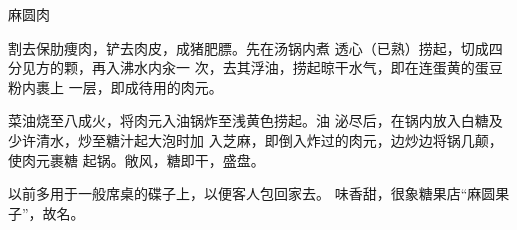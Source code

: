 \begin{recipe}{麻圆肉}

\ingredients


\cooking

\step 割去保肋痩肉，铲去肉皮，成猪肥膘。先在汤锅内煮 透心（已熟）捞起，切成四分见方的颗，再入沸水内汆一 次，去其浮油，捞起晾干水气，即在连蛋黄的蛋豆粉内裹上 一层，即成待用的肉元。

\step 菜油烧至八成火，将肉元入油锅炸至浅黄色捞起。油 泌尽后，在锅内放入白糖及少许清水，炒至糖汁起大泡时加 入芝麻，即倒入炸过的肉元，边炒边将锅几颠，使肉元裹糖 起锅。敞风，糖即干，盛盘。

\notes

以前多用于一般席桌的碟子上，以便客人包回家去。 味香甜，很象糖果店“麻圆果子”，故名。

\end{recipe}

